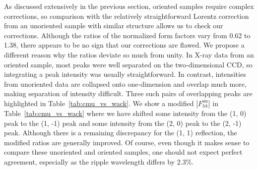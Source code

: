 As discussed extensively in the previous section, oriented samples require 
complex corrections, so 
comparison with the relatively 
straightforward Lorentz correction from an 
unoriented sample with similar structure allows us to check our corrections.  
Although the ratios of the normalized form factors vary from 0.62 to 1.38, 
there appears to be no sign that our corrections are flawed.  We propose a 
different reason why the ratios deviate so much from unity. In X-ray data from 
an oriented sample, most peaks were
well separated on the two-dimensional CCD, so integrating a peak intensity was 
usually straightforward.
In contrast, intensities from unoriented data are collapsed onto 
one-dimension and overlap much more, making separation of intensity 
difficult.  Three such pairs of overlapping peaks are highlighted in 
Table~\ref{tab:cmu_vs_wack}.  
We show a modified $\left|F_{hk}^\text{un}\right|$ in 
Table~\ref{tab:cmu_vs_wack} where we have shifted some intensity from 
the (1, 0) peak to the (1, -1) peak and some intensity from the (2, 0) peak 
to the (2, -1) peak.  
Although there is a remaining discrepancy for the (1, 1) reflection, 
the modified ratios are generally improved. Of course, even though it makes 
sense to compare these unoriented and oriented samples, one should not expect 
perfect agreement, especially as the ripple wavelength differs by 2.3\%.  

